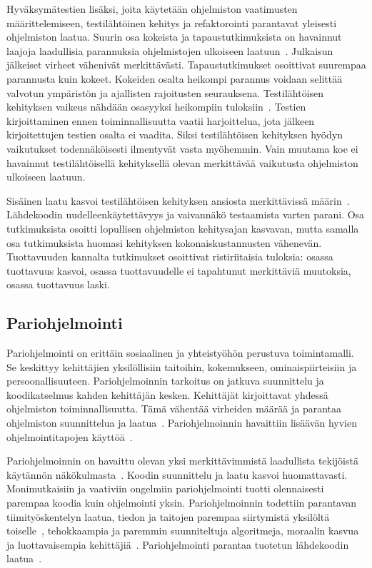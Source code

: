 \documentclass[finnish]{../tktltiki2}
\theoremstyle{definition}
\theoremstyle{remark}
\begin{document}
    Hyväksymätestien lisäksi, joita käytetään ohjelmiston vaatimusten määrit\-telemiseen, testilähtöinen kehitys ja 
refaktorointi parantavat yleisesti ohjelmiston laatua. Suurin osa kokeista ja tapaustutkimuksista on havainnut laajoja 
laadullisia parannuksia ohjelmistojen ulkoiseen laatuun~\cite{SS10}. Julkaisun jälkeiset virheet vähenivät 
merkittävästi. Tapaustutkimukset osoittivat suurempaa parannusta kuin kokeet. Kokeiden osalta heikompi parannus voidaan 
selittää valvotun ympäristön ja ajallisten rajoitusten seurauksena. Testilähtöisen kehityksen vaikeus nähdään osasyyksi 
heikompiin tuloksiin~\cite{PC11}. Testien kirjoittaminen ennen toiminnallisuutta vaatii harjoittelua, jota jälkeen 
kirjoitettujen testien osalta ei vaadita. Siksi testilähtöisen kehityksen hyödyn vaikutukset todennäköisesti ilmentyvät 
vasta myöhemmin. Vain muutama koe ei havainnut testilähtöisellä kehityksellä olevan merkittävää vaikutusta ohjelmiston 
ulkoiseen laatuun.

    Sisäinen laatu kasvoi testilähtöisen kehityksen ansiosta merkittävissä määrin~\cite{SS10}. Lähdekoodin 
uudelleenkäytettävyys ja vaivannäkö testaamista varten parani. Osa tutkimuksista osoitti lopullisen ohjelmiston 
kehitysajan kasvavan, mutta samalla osa tutkimuksista huomasi kehityksen kokonaiskustannusten vähenevän. Tuottavuuden 
kannalta tutkimukset osoittivat ristiriitaisia tuloksia: osassa tuottavuus kasvoi, osassa tuottavuudelle ei tapahtunut 
merkittäviä muutoksia, osassa tuottavuus laski.

\subsection{Pariohjelmointi}

Pariohjelmointi on erittäin sosiaalinen ja yhteistyöhön perustuva toimintamalli. Se keskittyy kehittäjien yksilöllisiin 
taitoihin, kokemukseen, ominaispiirteisiin ja persoonallisuuteen. Pariohjelmoinnin tarkoitus on jatkuva suunnittelu ja 
koodikatselmus kahden kehittäjän kesken. Kehittäjät kirjoittavat yhdessä ohjelmiston toiminnallisuutta. Tämä vähentää 
virheiden määrää ja parantaa ohjelmiston suunnittelua ja laatua~\cite{SS10}. Pariohjelmoinnin havaittiin lisäävän hyvien 
ohjelmointitapojen käyttöä~\cite{DD08}.

    Pariohjelmoinnin on havaittu olevan yksi merkittävimmistä laadullista tekijöistä käytännön näkökulmasta~\cite{SS10}. 
Koodin suunnittelu ja laatu kasvoi huomattavasti. Monimutkaisiin ja vaativiin ongelmiin pariohjelmointi tuotti 
olennaisesti parempaa koodia kuin ohjelmointi yksin. Pariohjelmoinnin todettiin parantavan tiimityöskentelyn laatua, 
tiedon ja taitojen parempaa siirtymistä yksilöltä toiselle~\cite{DD08, SS10}, tehokkaampia ja paremmin suunniteltuja 
algoritmeja, moraalin kasvua ja luottavaisempia kehittäjiä~\cite{SS10}. Pariohjelmointi parantaa tuotetun lähdekoodin 
laatua~\cite{DD08}.
\end{document}
